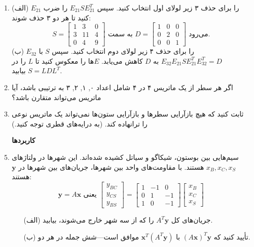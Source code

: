 \documentclass[12pt, a4paper]{book}
\begin{document}
\begin{enumerate}
		\item (الف) $E_{21}$ را برای حذف ۳ زیر لولای اول انتخاب کنید. سپس $E_{21}SE_{21}^T$ را ضرب کنید تا هر دو ۳ حذف شوند:
		\[ S = \begin{bmatrix} 1 & 3 & 0 \\ 3 & 11 & 4 \\ 0 & 4 & 9 \end{bmatrix} \text{ به سمت } D = \begin{bmatrix} 1 & 0 & 0 \\ 0 & 2 & 0 \\ 0 & 0 & 1 \end{bmatrix} \text{ می‌رود.} \]
		(ب) $E_{32}$ را برای حذف ۴ زیر لولای دوم انتخاب کنید. سپس $S$ با $E_{32}E_{21}SE_{21}^TE_{32}^T=D$ به $D$ کاهش می‌یابد. $E$ها را معکوس کنید تا $L$ را در $S=LDL^T$ بیابید.
		
		\item اگر هر سطر از یک ماتریس ۴ در ۴ شامل اعداد ۰, ۱, ۲, ۳ به ترتیبی باشد، آیا ماتریس می‌تواند متقارن باشد؟
		
		\item ثابت کنید که هیچ بازآرایی سطرها و بازآرایی ستون‌ها نمی‌تواند یک ماتریس نوعی را ترانهاده کند. (به درایه‌های قطری توجه کنید.)
		
		\item[] \textbf{کاربردها}
		
		\item سیم‌هایی بین بوستون، شیکاگو و سیاتل کشیده شده‌اند. این شهرها در ولتاژهای $x_B, x_C, x_S$ هستند. با مقاومت‌های واحد بین شهرها، جریان‌های بین شهرها در $\mathbf{y}$ هستند:
		\[ \mathbf{y} = A\mathbf{x} \text{ یعنی } \begin{bmatrix} y_{BC} \\ y_{CS} \\ y_{BS} \end{bmatrix} = \begin{bmatrix} 1 & -1 & 0 \\ 0 & 1 & -1 \\ 1 & 0 & -1 \end{bmatrix} \begin{bmatrix} x_B \\ x_C \\ x_S \end{bmatrix} \]
		\begin{itemize}
			\item[(الف)] جریان‌های کل $A^T\mathbf{y}$ را که از سه شهر خارج می‌شوند، بیابید.
			\item[(ب)] تأیید کنید که $(A\mathbf{x})^T\mathbf{y}$ با $\mathbf{x}^T(A^T\mathbf{y})$ موافق است—شش جمله در هر دو.
		\end{itemize}
		

\end{enumerate}
\end{document}
